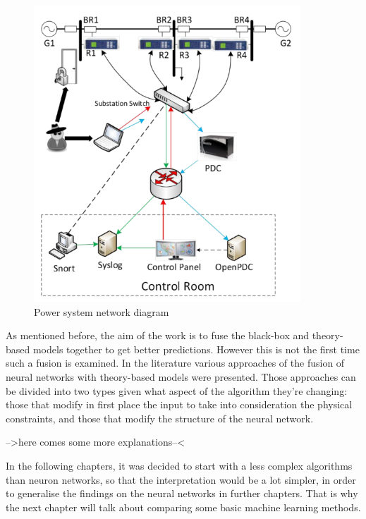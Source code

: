 \begin{figure}[H]
    \centering
    \includegraphics[width=100mm]{images/cps_rep.png}
    \caption{Power system network diagram \cite{adhikari_power_2014}}
    \label{fig:cps_rep}
\end{figure}

As mentioned before, the aim of the work is to fuse the black-box and theory-based models together to get better predictions. However this is not the first time such a fusion is examined. In the literature various approaches of the fusion of neural networks with theory-based models were presented. Those approaches can be divided into two types given what aspect of the algorithm they're changing: those that modify in first place the input to take into consideration the physical constraints, and those that modify the structure of the neural network.

-->here comes some more explanations--<

In the following chapters, it was decided to start with a less complex algorithms than neuron networks, so that the interpretation would be a lot simpler, in order to generalise the findings on the neural networks in further chapters. That is why the next chapter will talk about comparing some basic machine learning methods.